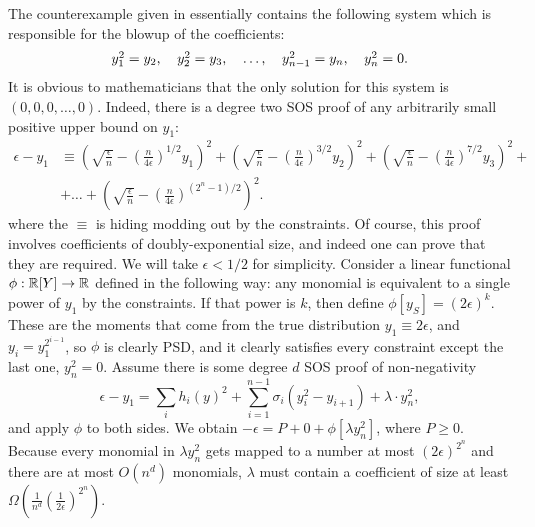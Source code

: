 The counterexample given in \cite{odonnel} essentially contains the following system which is responsible for the blowup of the coefficients:
\[\begin{tabular}{ccccc}
$y_1^2 = y_2$, & $y_2^2 = y_3$, & $\dots$, & $y_{n-1}^2 = y_n$, & $y_n^2 = 0$.
\end{tabular}\]
It is obvious to mathematicians that the only solution for this system is $(0,0,0,\dots,0)$. Indeed, there is a degree two SOS proof of any arbitrarily small positive upper bound on $y_1$:
\begin{align*}
\epsilon - y_1 &\equiv \left(\sqrt{\frac{\epsilon}{n}} - \left(\frac{n}{4\epsilon}\right)^{1/2}y_1\right)^2 + \left(\sqrt{\frac{\epsilon}{n}} - \left(\frac{n}{4\epsilon}\right)^{3/2}y_2\right)^2 + \left(\sqrt{\frac{\epsilon}{n}} - \left(\frac{n}{4\epsilon}\right)^{7/2}y_3\right)^2 + \\
&+\dots + \left(\sqrt{\frac{\epsilon}{n}} - \left(\frac{n}{4\epsilon}\right)^{(2^n-1)/2}\right)^2.
\end{align*}
where the $\equiv$ is hiding modding out by the constraints. Of course, this proof involves coefficients of doubly-exponential size, and indeed one can prove that they are required. We will take $\epsilon < 1/2$ for simplicity. Consider a linear functional $\phi: \mathbb R[Y] \rightarrow \mathbb R$ defined in the following way: any monomial is equivalent to a single power of $y_1$ by the constraints. If that power is $k$, then define $\phi[y_S] = (2\epsilon)^k$. These are the moments that come from the true distribution $y_1 \equiv 2\epsilon$, and $y_i = y_1^{2^{i-1}}$, so $\phi$ is clearly PSD, and it clearly satisfies every constraint except the last one, $y_n^2 = 0$. Assume there is some degree $d$ SOS proof of non-negativity
\[\epsilon - y_1 = \sum_i h_i(y)^2 + \sum_{i=1}^{n-1} \sigma_i(y_i^2 - y_{i+1}) + \lambda \cdot y_n^2,\]
and apply $\phi$ to both sides. We obtain $-\epsilon = P + 0 + \phi[\lambda y_n^2]$, where $P \geq 0$. Because every monomial in $\lambda y_n^2$ gets mapped to a number at most $(2\epsilon)^{2^n}$ and there are at most $O(n^d)$ monomials, $\lambda$ must contain a coefficient of size at least $\Omega(\frac{1}{n^d}\left(\frac{1}{2\epsilon}\right)^{2^n})$. 

